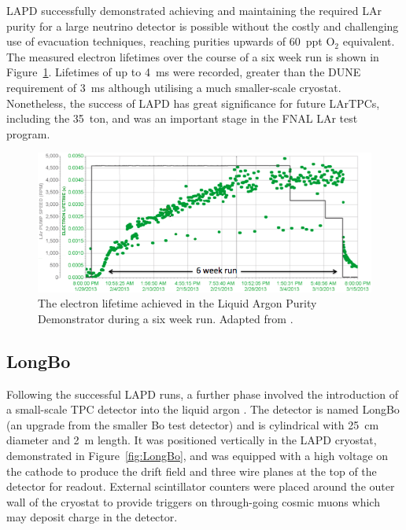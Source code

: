 LAPD successfully demonstrated achieving and maintaining the required LAr purity for a large neutrino detector is possible without the costly and challenging use of evacuation techniques, reaching purities upwards of 60~ppt O$_2$ equivalent.  The measured electron lifetimes over the course of a six week run is shown in Figure~\ref{fig:LAPDElectronLifetime}.  Lifetimes of up to 4~ms were recorded, greater than the DUNE requirement of 3~ms although utilising a much smaller-scale cryostat.  Nonetheless, the success of LAPD has great significance for future LArTPCs, including the 35~ton, and was an important stage in the FNAL LAr test program.

\begin{figure}[ht]
  \centering
  \includegraphics[width=12cm]{LAPDElectronLifetime.png}
  \caption[The electron lifetime achieved in the Liquid Argon Purity Demonstrator during a six week run.]{The electron lifetime achieved in the Liquid Argon Purity Demonstrator during a six week run.  Adapted from \cite{LAPD2014}.}
  \label{fig:LAPDElectronLifetime}
\end{figure}

\subsection{LongBo}\label{sec:LongBo}

Following the successful LAPD runs, a further phase involved the introduction of a small-scale TPC detector into the liquid argon \cite{LongBo2015}.  The detector is named LongBo (an upgrade from the smaller Bo test detector) and is cylindrical with 25~cm diameter and 2~m length.  It was positioned vertically in the LAPD cryostat, demonstrated in Figure~\ref{fig:LongBo}, and was equipped with a high voltage on the cathode to produce the drift field and three wire planes at the top of the detector for readout.  External scintillator counters were placed around the outer wall of the cryostat to provide triggers on through-going cosmic muons which may deposit charge in the detector.

